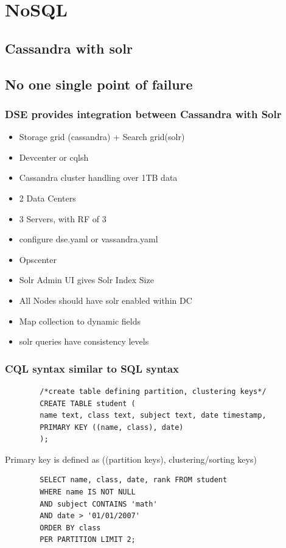 \documentclass{beamer}
\begin{document}

\section{NoSQL}
\subsection{Cassandra with solr}
\subsection{No one single point of failure}


\begin{frame}
\frametitle{DSE provides integration between Cassandra with Solr}
	\begin{itemize}
		\item Storage grid (cassandra) + Search grid(solr)
		\item Devcenter or cqlsh
		\item Cassandra cluster handling over 1TB data
		\item 2 Data Centers
		\item 3 Servers, with RF of 3
		\item configure dse.yaml or vassandra.yaml
		\item Opscenter
		\item Solr Admin UI gives Solr Index Size
		\item All Nodes should have solr enabled within DC
		\item Map collection to dynamic fields
		\item solr queries have consistency levels
	\end{itemize}

\end{frame}

\begin{frame}[fragile]
\frametitle{CQL syntax similar to SQL syntax}
	\begin{example}
		\begin{verbatim}
		/*create table defining partition, clustering keys*/
		CREATE TABLE student ( 
		name text, class text, subject text, date timestamp,
		PRIMARY KEY ((name, class), date) 
		);
		\end{verbatim}
	\end{example}
	Primary key is defined as ((partition keys), clustering/sorting keys)
	\begin{example}
		\begin{verbatim}
		SELECT name, class, date, rank FROM student 	
		WHERE name IS NOT NULL 
		AND subject CONTAINS 'math' 
		AND date > '01/01/2007' 
		ORDER BY class
		PER PARTITION LIMIT 2;
		\end{verbatim}
	\end{example}
\end{frame}
\end{document}
